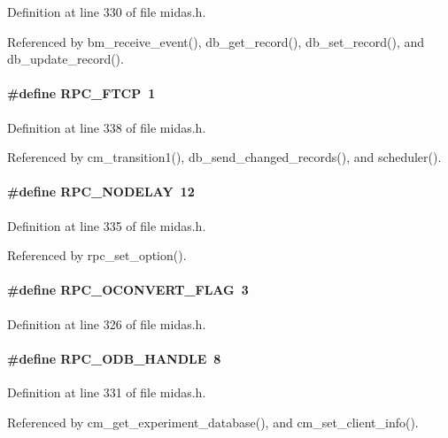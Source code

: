 Definition at line 330 of file midas.h.

Referenced by bm\_\-receive\_\-event(), db\_\-get\_\-record(), db\_\-set\_\-record(), and db\_\-update\_\-record().
\paragraph[{RPC\_\-FTCP}]{\setlength{\rightskip}{0pt plus 5cm}\#define RPC\_\-FTCP~1}\hfill\label{group__mdefineh_gaf80a4b4b5569b25d6e8488a6bafeb347}


Definition at line 338 of file midas.h.

Referenced by cm\_\-transition1(), db\_\-send\_\-changed\_\-records(), and scheduler().
\paragraph[{RPC\_\-NODELAY}]{\setlength{\rightskip}{0pt plus 5cm}\#define RPC\_\-NODELAY~12}\hfill\label{group__mdefineh_gabc81b907fb096f57766487d3ae18a732}


Definition at line 335 of file midas.h.

Referenced by rpc\_\-set\_\-option().
\paragraph[{RPC\_\-OCONVERT\_\-FLAG}]{\setlength{\rightskip}{0pt plus 5cm}\#define RPC\_\-OCONVERT\_\-FLAG~3}\hfill\label{group__mdefineh_ga453a4fa00b98cf0c6369a9ed9f2c6f4e}


Definition at line 326 of file midas.h.
\paragraph[{RPC\_\-ODB\_\-HANDLE}]{\setlength{\rightskip}{0pt plus 5cm}\#define RPC\_\-ODB\_\-HANDLE~8}\hfill\label{group__mdefineh_ga26df61334e35fe4bba4ba7353dcbb66b}


Definition at line 331 of file midas.h.

Referenced by cm\_\-get\_\-experiment\_\-database(), and cm\_\-set\_\-client\_\-info().
